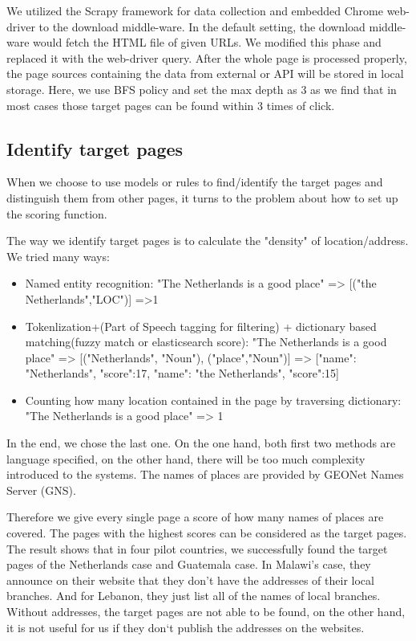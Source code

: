 \documentclass[sigchi]{acmart}
\begin{document}
We utilized the Scrapy framework for data collection and embedded Chrome web-driver to the download middle-ware. In the default setting, the download middle-ware would fetch the HTML file of given URLs. We modified this phase and replaced it with the web-driver query. After the whole page is processed properly, the page sources containing the data from external or API will be stored in local storage. Here, we use BFS policy and set the max depth as 3 as we find that in most cases those target pages can be found within 3 times of click.

\subsection{Identify target pages}

When we choose to use models or rules to find/identify the target pages and distinguish them from other pages, it turns to the problem about how to set up the scoring function.

The way we identify target pages is to calculate the "density" of location/address. We tried many ways:
\begin{itemize}
    \item Named entity recognition: "The Netherlands is a good place" => [("the Netherlands","LOC")] =>1
    \item Tokenlization+(Part of Speech tagging for filtering) + dictionary based matching(fuzzy match or elasticsearch score): "The Netherlands is a good place" => [("Netherlands", "Noun"), ("place","Noun")] => [{"name": "Netherlands", "score":17}, {"name": "the Netherlands", "score":15}]
    \item Counting how many location contained in the page by traversing dictionary: "The Netherlands is a good place" => 1
\end{itemize}

In the end, we chose the last one. On the one hand, both first two methods are language specified, on the other hand, there will be too much complexity introduced to the systems. The names of places are provided by GEONet Names Server (GNS).

Therefore we give every single page a score of how many names of places are covered. The pages with the highest scores can be considered as the target pages. The result shows that in four pilot countries, we successfully found the target pages of the Netherlands case and Guatemala case. In Malawi's case, they announce on their website that they don't have the addresses of their local branches. And for Lebanon, they just list all of the names of local branches. Without addresses, the target pages are not able to be found, on the other hand, it is not useful for us if they don`t publish the addresses on the websites. 
\end{document}
